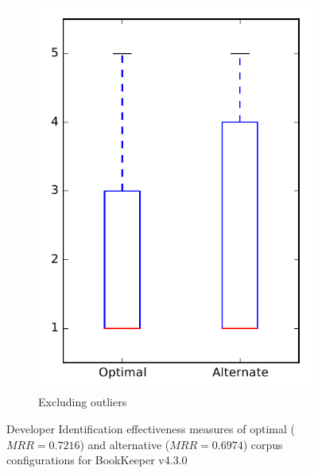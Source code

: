 \begin{figure}
\begin{subfigure}{.4\textwidth}
        \includegraphics[height=0.4\textheight]{figures/combo/dit_rq2_bookkeeper_no_outlier}
        \caption{Excluding outliers}\label{fig:combo:dit:rq2:bookkeeper_no_outlier}
    \end{subfigure}
\caption{Developer Identification effectiveness measures of optimal ($MRR=0.7216$) and alternative ($MRR=0.6974$) corpus configurations for BookKeeper v4.3.0}
\label{fig:combo:dit:rq2:bookkeeper}
\end{figure}
